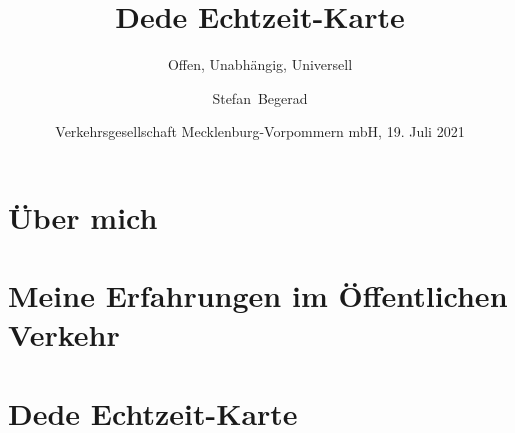 \documentclass{beamer}
\title[Dede]%
{Dede Echtzeit-Karte}
\subtitle{Offen, Unabhängig, Universell}
\author[Begerad]%
{Stefan~Begerad}
\date[VMV, 19. Juli 2021]%
{Verkehrsgesellschaft Mecklenburg-Vorpommern mbH, 19. Juli 2021}
\begin{document}
\begin{frame}
  \titlepage
\end{frame}


\section{Über mich}



\section{Meine Erfahrungen im Öffentlichen Verkehr}





\section{Dede Echtzeit-Karte}


\end{document}

